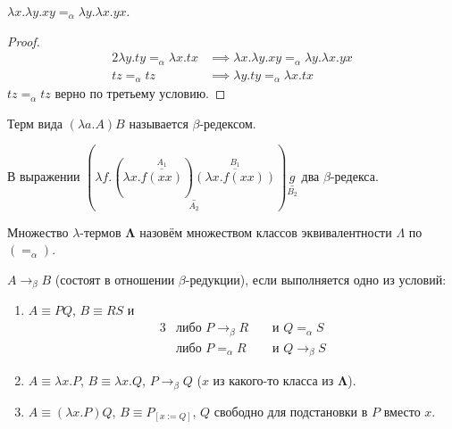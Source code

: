 \begin{example}
    $\lambda{}x.\lambda{}y.xy=_{\alpha}\lambda{}y.\lambda{}x.yx$.
    \begin{proof}
        \begin{alignat*}{2}
            \lambda{}y.ty=_{\alpha}\lambda{}x.tx &\implies \lambda{}x.\lambda{}y.xy=_{\alpha}\lambda{}y.\lambda{}x.yx \\
            tz=_{\alpha}tz &\implies \lambda{}y.ty=_{\alpha}\lambda{}x.tx
        \end{alignat*}
        $tz=_{\alpha}tz$ верно по третьему условию.
    \end{proof}
\end{example}

\begin{definition}
    Терм вида $\left(\lambda{}a.A\right)B$ называется $\beta$-редексом.
\end{definition}

\begin{example}
    В выражении
    $
        (
            \lambda{}f.
                \underset{A_2}{\underline{
                    (\lambda{}x.\overset{A_1}{\overline{f(xx)}})
                    \overset{B_1}{\overline{(\lambda{}x.f(xx))}}
                }}
        )\underset{B_2}{\underline{g}}
    $ два $\beta$-редекса.
\end{example}

\begin{definition}
    Множество $\lambda$-термов $\bm{\Lambda}$ назовём множеством классов эквивалентности $\Lambda$ по $(=_{\alpha})$.
\end{definition}

\begin{definition}
    $A\rightarrow_{\beta}B$ (состоят в отношении $\beta$-редукции), если выполняется одно из условий:
    \begin{enumerate}
        \item $A\equiv{}PQ$, $B\equiv{}RS$ и
        \begin{alignat*}{3}
            &\text{либо } P\rightarrow_{\beta}R  &&\text{ и } Q=_{\alpha}S \\
            &\text{либо } P=_{\alpha}R           &&\text{ и } Q\rightarrow_{\beta}S
        \end{alignat*}
        \item $A\equiv{}\lambda{}x.P$, $B\equiv{}\lambda{}x.Q$, $P\rightarrow_{\beta}Q$ ($x$ из какого-то класса из $\bm{\Lambda}$).
        \item $A\equiv{}(\lambda{}x.P)Q$, $B\equiv{}P_{[x:=Q]}$, $Q$ свободно для подстановки в $P$ вместо $x$.
    \end{enumerate}
\end{definition}

